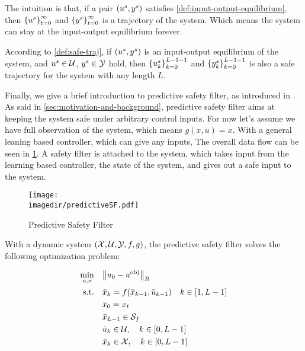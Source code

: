 The intuition is that, if a pair $\left(u^s, y^s\right)$ satisfies \cref{def:input-output-equilibrium}, then $\left\{u^s\right\}_{t=0}^{\infty}$ and $\left\{y^s\right\}_{t=0}^{\infty}$ is a trajectory of the system.
Which means the system can stay at the input-output equilibrium forever.

\begin{remark}\label{remark:safe-equilibrium}
    According to \cref{def:safe-traj}, if $\left(u^s, y^s\right)$ is an input-output equilibrium of the system, and $u^s \in \mathcal{U}$, $y^s \in \mathcal{Y}$ hold, then $\left\{u^s_k\right\}_{k=0}^{L-1-1}$ and $\left\{y^s_k\right\}_{k=0}^{L-1-1}$ is also a safe trajectory for the system with any length $L$.
\end{remark}

Finally, we give a brief introduction to predictive safety filter, as introduced in \cite{wabersich_predictive_sf_2021}.
As said in \cref{sec:motivation-and-background}, predictive safety filter aims at keeping the system safe under arbitrary control inputs.
For now let's assume we have full observation of the system, which means $g(x,u) = x$.
With a general leaning based controller, which can give any inputs, The overall data flow can be seen in \cref{img:predictive-safety-filter}.
A safety filter is attached to the system, which takes input from the learning based controller, the state of the system, and gives out a safe input to the system.

\begin{figure}[ht]
    \centering
    \texttt{[image: \\imagedir/predictiveSF.pdf]}
    \caption{Predictive Safety Filter}
    \label{img:predictive-safety-filter}
\end{figure}

With a dynamic system $\left(\mathcal{X}, \mathcal{U}, \mathcal{Y}, f, g\right)$, the predictive safety filter solves the following optimization problem:

\begin{subequations}
\label{eq:state-based-safety-filter} 
\begin{align}
    \min_{\substack{\bar{u}, \bar{x}}} \quad & \norm{u_{0} - u^{\text{obj}}}_R  \label{eq:state-based-safety-filter-cost} \\
    \textrm{s.t.} \quad & 
    \bar{x}_{k} = f(\bar{x}_{k-1}, \bar{u}_{k-1}) \quad k \in \left[1, L-1\right] \label{eq:state-based-safety-filter-dynamics} \\
    & 
    \bar{x}_0 = x_t \label{eq:state-based-safety-filter-initial}\\
    & 
    \bar{x}_{L-1} \in \mathcal{S}_f \label{eq:state-based-safety-filter-terminal} \\
    &
    \bar{u}_k \in \mathcal{U}, \quad k \in \left[0, L-1\right] \label{eq:state-based-safety-filter-input}\\
    &
    \bar{x}_k \in \mathcal{X}, \quad k \in \left[0, L-1\right] \label{eq:state-based-safety-filter-output}
\end{align}
\end{subequations}

